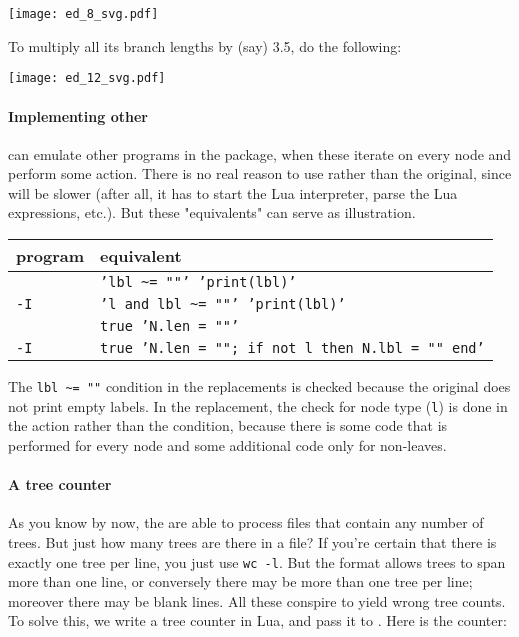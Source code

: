 
\begin{center}
\texttt{[image: ed\_8\_svg.pdf]}
\end{center}

To multiply all its branch lengths by (say) 3.5, do the following:


\begin{center}
\texttt{[image: ed\_12\_svg.pdf]}
\end{center}

\paragraph{Implementing other \nutils}

\noindent{}\luaed{} can emulate other programs in the package, when these
iterate on every node and perform some action. There is no real reason to use
\luaed{} rather than the original, since \luaed{} will be slower (after all, it
has to start the Lua interpreter, parse the Lua expressions, etc.). But these
"equivalents" can serve as illustration.

\begin{center}
\begin{tabular}{ll}
program & \luaed{} equivalent \\
\hline
{}{} 						& {\tt 'lbl \~{}= ""' 'print(lbl)'}  \\
{} {\tt -I} 		& {\tt 'l and lbl \~{}= ""' 'print(lbl)'} \\
\topology{}						& {\tt true 'N.len = ""'} \\
\topology{} {\tt -I} 	& {\tt true 'N.len = ""; if not l then N.lbl = "" end'}
\end{tabular}
\end{center}

The {\tt lbl \~{}= ""} condition in the  replacements is checked
because the original  does not print empty labels. In the \topology{}
replacement, the check for node type (\texttt{l}) is done in the action rather
than the condition, because there is some code that is performed for every node
and some additional code only for non-leaves. 

\paragraph{A tree counter}

As you know by now, the \nutils{} are able to process files that contain any
number of trees. But just how many trees are there in a file? If you're certain
that there is exactly one tree per line, you just use \texttt{wc -l}. But the
\nw{} format allows trees to span more than one line, or conversely there may be
more than one tree per line; moreover there may be blank lines. All these
conspire to yield wrong tree counts. To solve this, we write a tree counter in
Lua, and pass it to \luaed. Here is the counter:

